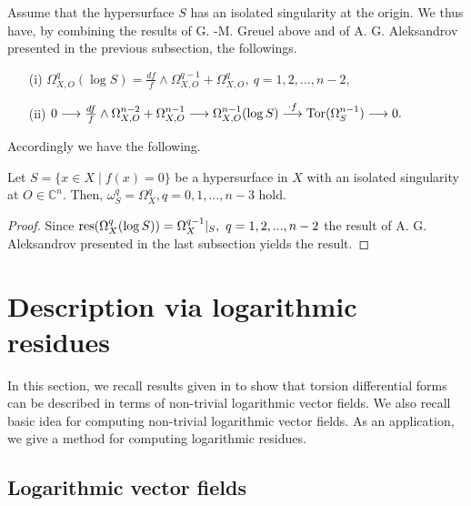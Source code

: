 \documentclass[pdftex]{arxsigma}
\begin{document}
Assume that the hypersurface $S$ has an isolated singularity at the origin. 
We thus have, by combining the results of G. -M. Greuel above and of A. G. Aleksandrov presented in the previous subsection, the followings.



\begin{enumerate}
\item[(i)] $\Omega_{X,O}^{q}(\log S)= \frac{df}{f} \wedge \Omega_{X,O}^{q-1}+\Omega_{X,O}^{q},  \ q=1,2,\ldots, n-2, $

\item[(ii)] $  0 \longrightarrow\frac{df}{f} \wedge \Omega_{X,O}^{n-2} +  \Omega_{X,O}^{n-1}\longrightarrow 
\Omega_{X,O}^{n-1}(\log S) \stackrel{\cdot f}\longrightarrow {\rm Tor}(\Omega_{S}^{n-1}) \longrightarrow 0. $
\end{enumerate}

Accordingly we have the following.

\begin{proposition} Let  $ S = \{ x \in X \mid f(x) = 0 \} $ be a hypersurface in $ X $ 
with an isolated singularity at $ O \in {\mathbb C}^n. $ Then,
$ \omega_S^{q} = \Omega_X^{q}, q=0,1,...,n-3 $ hold.
\end{proposition}
\begin{proof}
Since $ {\rm res}(\Omega_X^{q}(\log S)) = \Omega_X^{q-1} |_S, \ q=1,2,...,n-2 $
the result of A. G. Aleksandrov presented in the last subsection yields the result. 
\end{proof}


\section{Description via logarithmic residues}

In this section, we recall results given in \cite{TN20} to show that torsion differential forms can be described 
in terms of non-trivial logarithmic vector fields. We also recall basic idea for computing non-trivial logarithmic vector fields. As an application, 
we give a method for computing logarithmic residues. 

\subsection{Logarithmic vector fields}
\end{document}
